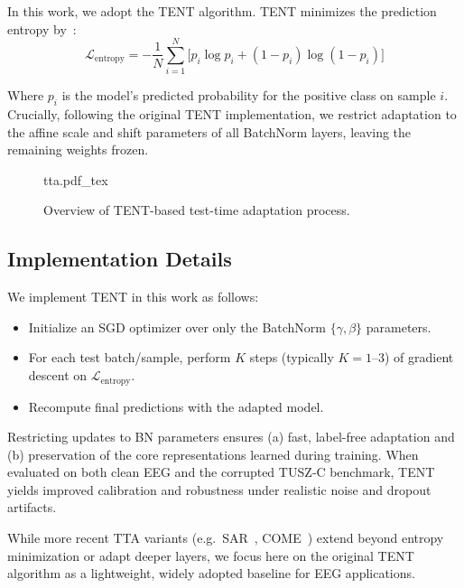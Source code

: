 In this work, we adopt the TENT algorithm.  TENT minimizes the prediction entropy  by~\cite{tta}:
\begin{equation}
\mathcal{L}_{\mathrm{entropy}}
= -\frac{1}{N}\sum_{i=1}^{N}\bigl[p_i\log p_i + (1-p_i)\log(1-p_i)\bigr]   
\end{equation}

Where \(p_i\) is the model’s predicted probability for the positive class on sample \(i\).  Crucially, following the original TENT implementation, we restrict adaptation to the affine scale and shift parameters of all BatchNorm layers, leaving the remaining weights frozen.  

\begin{figure}[h]
  \centering
  \def\svgwidth{0.8\columnwidth}
  {tta.pdf_tex}
  \caption[Overview of TENT-based test-time adaptation process]{Overview of TENT-based test-time adaptation process.}
  \label{fig:tta}
\end{figure}

\subsection*{Implementation Details}

We implement TENT in this work as follows:
\begin{itemize}
  \item Initialize an SGD optimizer over only the BatchNorm \(\{\gamma,\beta\}\) parameters.
  \item For each test batch/sample, perform \(K\) steps (typically \(K=1\)–3) of gradient descent on \(\mathcal{L}_{\mathrm{entropy}}\).  
  \item Recompute final predictions with the adapted model.
\end{itemize}

Restricting updates to BN parameters ensures (a) fast, label-free adaptation and (b) preservation of the core representations learned during training.  When evaluated on both clean EEG and the corrupted TUSZ‐C benchmark, TENT yields improved calibration and robustness under realistic noise and dropout artifacts.

While more recent TTA variants (e.g.\ SAR~\cite{ZHOU2024109974}, COME~\cite{tta2}) extend beyond entropy minimization or adapt deeper layers, we focus here on the original TENT algorithm as a lightweight, widely adopted baseline for EEG applications.

